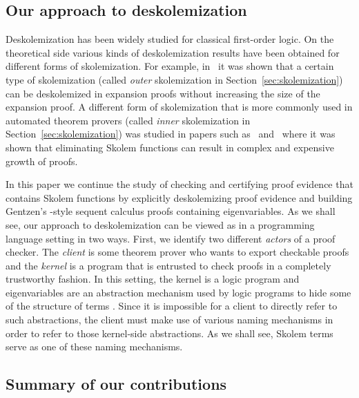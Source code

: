\documentclass[a4paper,USenglish]{lipics-v2018}
\begin{document}
\subsection{Our approach to deskolemization}
\label{ssec:deskolem}

Deskolemization has been widely studied for classical first-order
logic.
%
On the theoretical side various kinds of deskolemization results have
been obtained for different forms of skolemization.
%
For example, in~\cite{miller83,miller87sl} it was shown that a certain
type of skolemization (called \emph{outer} skolemization in
Section~\ref{sec:skolemization}) can be deskolemized in expansion
proofs without increasing the size of the expansion proof.
%
A different form of skolemization that is more commonly used in
automated theorem provers (called \emph{inner} skolemization in
Section~\ref{sec:skolemization}) was studied in papers such
as~\cite{avigad03tocl} and~\cite{baaz12jsl} where it was shown that
eliminating Skolem functions can result in complex and expensive
growth of proofs.

In this paper we continue the study of checking and certifying proof
evidence that contains Skolem functions by explicitly deskolemizing
proof evidence and building Gentzen's \LK-style sequent calculus
proofs containing eigenvariables.
%
As we shall see, our approach to deskolemization can be viewed as in a
programming language setting in two ways.
%
First, we identify two different \emph{actors} of a proof checker.
%
The \emph{client} is some theorem prover who wants to export checkable
proofs and the \emph{kernel} is a program that is entrusted to check
proofs in a completely trustworthy fashion.
%
In this setting, the kernel is a logic program and eigenvariables are
an abstraction mechanism used by logic programs to hide some of the
structure of terms \cite{miller90abs}.
%
Since it is impossible for a client to directly refer to such
abstractions, the client must make use of various naming mechanisms in
order to refer to those kernel-side abstractions.
%
As we shall see, Skolem terms serve as one of these naming
mechanisms.


\subsection{Summary of our contributions}
\end{document}

